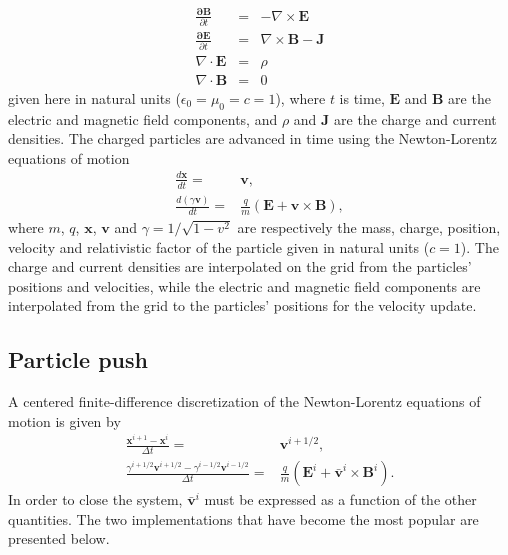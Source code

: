 \documentclass[]{report}
\begin{document}
\begin{subequations}
\begin{eqnarray}
\frac{\mathbf{\partial B}}{\partial t} & = & -\nabla\times\mathbf{E}\label{Eq:Faraday-1}\\
\frac{\mathbf{\partial E}}{\partial t} & = & \nabla\times\mathbf{B}-\mathbf{J}\label{Eq:Ampere-1}\\
\nabla\cdot\mathbf{E} & = & \rho\label{Eq:Gauss-1}\\
\nabla\cdot\mathbf{B} & = & 0\label{Eq:divb-1}
\end{eqnarray}
\end{subequations}
given here in natural units ($\epsilon_0=\mu_0=c=1$), where $t$ is time, $\mathbf{E}$ and
$\mathbf{B}$ are the electric and magnetic field components, and
$\rho$ and $\mathbf{J}$ are the charge and current densities. The
charged particles are advanced in time using the Newton-Lorentz equations
of motion 
\begin{subequations}
\begin{align}
\frac{d\mathbf{x}}{dt}= & \mathbf{v},\label{Eq:Lorentz_x-1}\\
\frac{d\left(\gamma\mathbf{v}\right)}{dt}= & \frac{q}{m}\left(\mathbf{E}+\mathbf{v}\times\mathbf{B}\right),\label{Eq:Lorentz_v-1}
\end{align}
\end{subequations}
where $m$, $q$, $\mathbf{x}$, $\mathbf{v}$ and $\gamma=1/\sqrt{1-v^{2}}$
 are respectively the mass, charge, position, velocity and relativistic
factor of the particle given in natural units ($c=1$). The charge and current densities are interpolated
on the grid from the particles' positions and velocities, while the
electric and magnetic field components are interpolated from the grid
to the particles' positions for the velocity update.

\subsection{Particle push}

A centered finite-difference discretization of the Newton-Lorentz
equations of motion is given by 
\begin{subequations}
\begin{align}
\frac{\mathbf{x}^{i+1}-\mathbf{x}^{i}}{\Delta t}= & \mathbf{v}^{i+1/2},\label{Eq:leapfrog_x}\\
\frac{\gamma^{i+1/2}\mathbf{v}^{i+1/2}-\gamma^{i-1/2}\mathbf{v}^{i-1/2}}{\Delta t}= & \frac{q}{m}\left(\mathbf{E}^{i}+\mathbf{\bar{v}}^{i}\times\mathbf{B}^{i}\right).\label{Eq:leapfrog_v}
\end{align}
\end{subequations}
In order to close the system, $\bar{\mathbf{v}}^{i}$ must be
expressed as a function of the other quantities. The two implementations that have become the most popular are presented below.
\end{document}
